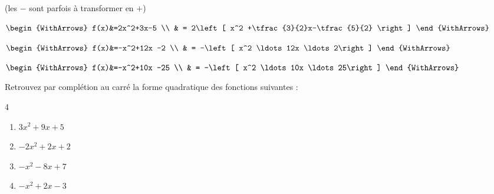 \documentclass[main.tex]{subfiles}
\begin{document}
\begin{example}(les $-$ sont parfois à transformer en $+$)\hfill

\noindent
\parbox{0.35\linewidth}{
	\noindent
	$\begin{WithArrows}
		f(x)&=2x^2+3x-5 \\
		& = 2\left[ x^2 +\tfrac{3}{2}x-\tfrac{5}{2} \right] %
	\end{WithArrows}$
}	\hfill 
\parbox{0.35\linewidth}{
	\noindent
	$\begin{WithArrows}
		f(x)&=-x^2+12x -2 \\
		& = -\left[ x^2 \ldots 12x \ldots 2\right] %
	\end{WithArrows}$
}\hfill 
\parbox{0.25\linewidth}{
\noindent
$\begin{WithArrows}
	f(x)&=-x^2+10x -25 \\
	& = -\left[ x^2 \ldots 10x \ldots 25\right] %
\end{WithArrows}$
}
\end{example}
\vfill 
\begin{exercise}\label{chapitre01:exercice:completioncarre:02} Retrouvez par complétion au carré la forme quadratique des fonctions suivantes :
	\vspace{-1em}
	\begin{multicols}{4} 
		\begin{enumerate}[label={$f_\arabic*(x)=$}, leftmargin=*] 
			\item $3x^2+9x+5$  
			\item $-2x^2+2x+2$  
			\item $-x^2-8x+7$  
			\item $-x^2+2x-3$   
		\end{enumerate}
	\end{multicols} 
\end{exercise}
\end{document}

